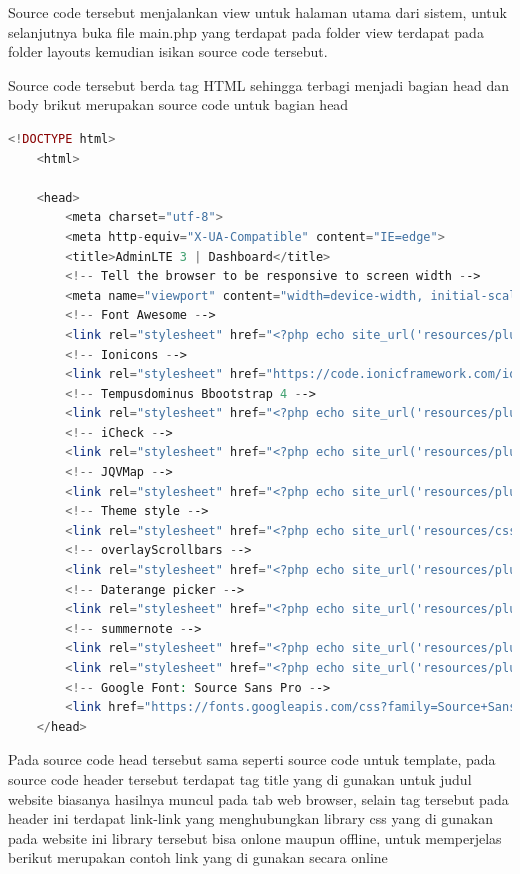 Source code tersebut menjalankan view untuk halaman utama dari sistem, untuk selanjutnya buka file main.php yang terdapat pada folder view terdapat pada folder layouts kemudian isikan source code tersebut.\par
Source code tersebut berda tag HTML sehingga terbagi menjadi bagian head dan body brikut merupakan source code untuk bagian head\par
\pagebreak
\begin{lstlisting}[language=PHP]
	<!DOCTYPE html>  
	<html>  
	  
	<head>  
	    <meta charset="utf-8">  
	    <meta http-equiv="X-UA-Compatible" content="IE=edge">  
	    <title>AdminLTE 3 | Dashboard</title>  
	    <!-- Tell the browser to be responsive to screen width -->  
	    <meta name="viewport" content="width=device-width, initial-scale=1">  
	    <!-- Font Awesome -->  
	    <link rel="stylesheet" href="<?php echo site_url('resources/plugins/fontawesome-free/css/all.min.css'); ?>">  
	    <!-- Ionicons -->  
	    <link rel="stylesheet" href="https://code.ionicframework.com/ionicons/2.0.1/css/ionicons.min.css">  
	    <!-- Tempusdominus Bbootstrap 4 -->  
	    <link rel="stylesheet" href="<?php echo site_url('resources/plugins/tempusdominus-bootstrap-4/css/tempusdominus-bootstrap-4.min.css'); ?>">  
	    <!-- iCheck -->  
	    <link rel="stylesheet" href="<?php echo site_url('resources/plugins/icheck-bootstrap/icheck-bootstrap.min.css'); ?>">  
	    <!-- JQVMap -->  
	    <link rel="stylesheet" href="<?php echo site_url('resources/plugins/jqvmap/jqvmap.min.css'); ?>">  
	    <!-- Theme style -->  
	    <link rel="stylesheet" href="<?php echo site_url('resources/css/adminlte.min.css'); ?>">  
	    <!-- overlayScrollbars -->  
	    <link rel="stylesheet" href="<?php echo site_url('resources/plugins/overlayScrollbars/css/OverlayScrollbars.min.css'); ?>">  
	    <!-- Daterange picker -->  
	    <link rel="stylesheet" href="<?php echo site_url('resources/plugins/daterangepicker/daterangepicker.css'); ?>">  
	    <!-- summernote -->  
	    <link rel="stylesheet" href="<?php echo site_url('resources/plugins/summernote/summernote-bs4.css'); ?>">  
	    <link rel="stylesheet" href="<?php echo site_url('resources/plugins/datatables-bs4/css/dataTables.bootstrap4.css'); ?>">  
	    <!-- Google Font: Source Sans Pro -->  
	    <link href="https://fonts.googleapis.com/css?family=Source+Sans+Pro:300,400,400i,700" rel="stylesheet">  
	</head>
\end{lstlisting}

Pada source code head tersebut sama seperti source code untuk template, pada source code header tersebut terdapat tag title yang di gunakan untuk judul website biasanya hasilnya muncul pada tab web browser, selain tag tersebut pada header ini terdapat link-link yang menghubungkan library css yang di gunakan pada website ini library tersebut bisa onlone maupun offline, untuk memperjelas berikut merupakan contoh link yang di gunakan secara online \par

